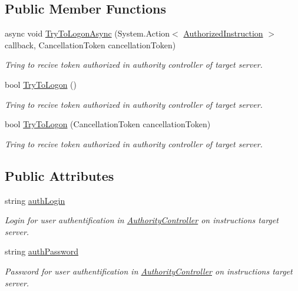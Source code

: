 \subsection*{Public Member Functions}
\begin{DoxyCompactItemize}
\item 
async void \mbox{\hyperlink{class_pipes_provider_1_1_networking_1_1_routing_1_1_authorized_instruction_a20e94ddf386abb937f4c725a094dc050}{Try\+To\+Logon\+Async}} (System.\+Action$<$ \mbox{\hyperlink{class_pipes_provider_1_1_networking_1_1_routing_1_1_authorized_instruction}{Authorized\+Instruction}} $>$ callback, Cancellation\+Token cancellation\+Token)
\begin{DoxyCompactList}\small\item\em Tring to recive token authorized in authority controller of target server. \end{DoxyCompactList}\item 
bool \mbox{\hyperlink{class_pipes_provider_1_1_networking_1_1_routing_1_1_authorized_instruction_addf69c3fea172cc9d8199097466a052f}{Try\+To\+Logon}} ()
\begin{DoxyCompactList}\small\item\em Tring to recive token authorized in authority controller of target server. \end{DoxyCompactList}\item 
bool \mbox{\hyperlink{class_pipes_provider_1_1_networking_1_1_routing_1_1_authorized_instruction_a067f546d69e4766868c1e28feef51acf}{Try\+To\+Logon}} (Cancellation\+Token cancellation\+Token)
\begin{DoxyCompactList}\small\item\em Tring to recive token authorized in authority controller of target server. \end{DoxyCompactList}\end{DoxyCompactItemize}
\subsection*{Public Attributes}
\begin{DoxyCompactItemize}
\item 
string \mbox{\hyperlink{class_pipes_provider_1_1_networking_1_1_routing_1_1_authorized_instruction_aabef40719c548a28cd3517516be58ded}{auth\+Login}}
\begin{DoxyCompactList}\small\item\em Login for user authentification in \mbox{\hyperlink{namespace_authority_controller}{Authority\+Controller}} on instruction\textquotesingle{}s target server. \end{DoxyCompactList}\item 
string \mbox{\hyperlink{class_pipes_provider_1_1_networking_1_1_routing_1_1_authorized_instruction_aef611c3d3856d276dce814d7f4aaaee2}{auth\+Password}}
\begin{DoxyCompactList}\small\item\em Password for user authentification in \mbox{\hyperlink{namespace_authority_controller}{Authority\+Controller}} on instruction\textquotesingle{}s target server. \end{DoxyCompactList}\end{DoxyCompactItemize}
